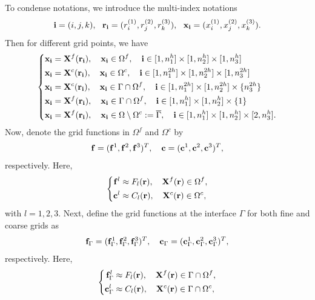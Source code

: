  To condense notations, we introduce the multi-index notations
\[{\bf i} = (i,j,k),\ \ {\bf r}_{\bf i} = (r^{(1)}_i,r^{(2)}_j,r^{(3)}_k),\ \ {\bf x}_{\bf i} = (x^{(1)}_i,x^{(2)}_j,x^{(3)}_k).\]
Then for different grid points, we have
\begin{equation*}
\left\{
\begin{aligned}
{\bf x}_{\bf i} &= {\bf X}^f({\bf r}_{\bf i}), \quad {\bf x}_{\bf i}\in\Omega^f, \quad {\bf i}\in[1,n_1^h]\times[1,n_2^h]\times[1,n_3^h]\\
{\bf x}_{\bf i} &= {\bf X}^c({\bf r}_{\bf i}), \quad {\bf x}_{\bf i}\in\Omega^c, \quad  {\bf i}\in[1,n_1^{2h}]\times[1,n_2^{2h}]\times[1,n_3^{2h}]\\
{\bf x}_{\bf i} &= {\bf X}^c({\bf r}_{\bf i}), \quad {\bf x}_{\bf i} \in \Gamma\cap\Omega^f, \quad{\bf i}\in[1,n_1^{2h}]\times[1,n_2^{2h}]\times\{ n_3^{2h}\}\\
{\bf x}_{\bf i} &= {\bf X}^f({\bf r}_{\bf i}), \quad {\bf x}_{\bf i} \in \Gamma\cap\Omega^f, \quad{\bf i}\in[1,n_1^h]\times[1,n_2^h]\times\{1\}\\
{\bf x}_{\bf i} &= {\bf X}^f({\bf r}_{\bf i}), \quad {\bf x}_{\bf i}\in \Omega \setminus \Omega^c := \overline{\Gamma}, \quad {\bf i}\in[1,n_1^h]\times[1,n_2^h]\times[2,n_3^h].
\end{aligned}
\right.
\end{equation*}
Now, denote the grid functions in $\Omega^f$ and $\Omega^c$ by
\begin{equation}\label{grid_function}
{\bf f} = ({\bf f}^1, {\bf f}^2, {\bf f}^3)^T, \quad {\bf c} = ({\bf c}^1, {\bf c}^2, {\bf c}^3)^T,
\end{equation}
respectively. Here, 
\begin{equation*}
\left\{
\begin{aligned}
{\bf f}^l&\approx F_l({\bf r}), \quad {\bf X}^f({\bf r})\in\Omega^f, \\
{\bf c}^l&\approx C_l({\bf r}),\quad {\bf X}^c({\bf r})\in\Omega^c,
\end{aligned}
\right.
\end{equation*}
with $l = 1,2,3$. Next, define the grid functions at the interface $\Gamma$ for both fine and coarse grids as
\[{\bf f}_\Gamma = ({\bf f}_\Gamma^1, {\bf f}_\Gamma^2, {\bf f}_\Gamma^3)^T, \quad {\bf c}_\Gamma = ({\bf c}_\Gamma^1, {\bf c}_\Gamma^2, {\bf c}_\Gamma^3)^T,\]
respectively. Here, 
\begin{equation*}
\left\{
\begin{aligned}
{\bf f}_\Gamma^l&\approx F_l({\bf r}), \quad {\bf X}^f({\bf r})\in\Gamma\cap\Omega^f, \\
{\bf c}_\Gamma^l&\approx C_l({\bf r}),\quad {\bf X}^c({\bf r})\in\Gamma\cap\Omega^c,
\end{aligned}
\right.
\end{equation*}
